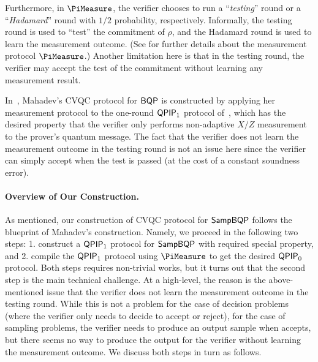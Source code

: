 Furthermore, in $\PiMeasure$, the verifier chooses to run a ``\emph{testing}'' round or a ``\emph{Hadamard}'' round with $1/2$ probability, respectively. Informally, the testing round is used to ``test'' the commitment of $\rho$, and the Hadamard round is used to learn the measurement outcome. (See  for further details about the measurement protocol $\PiMeasure$.) Another limitation here is that in the testing round, the verifier may accept the test of the commitment without learning any measurement result. 

In~\cite{FOCS:Mahadev18a}, Mahadev's CVQC protocol for $\operatorname{\mathsf{BQP}}$ is constructed by applying her measurement protocol to the one-round $\operatorname{\mathsf{QPIP}}_1$ protocol of~\cite{PhysRevA.93.022326, mf16}, which has the desired property that the verifier only performs non-adaptive $X/Z$ measurement to the prover's quantum message. The fact that the verifier does not learn the measurement outcome in the testing round is not an issue here since the verifier can simply accept when the test is passed (at the cost of a constant soundness error).

\paragraph{Overview of Our Construction.}
As mentioned, our construction of CVQC protocol for $\operatorname{\mathsf{SampBQP}}$ follows the blueprint of Mahadev's construction. Namely, we proceed in the following two steps: 1. construct a $\operatorname{\mathsf{QPIP}}_1$ protocol for $\operatorname{\mathsf{SampBQP}}$ with required special property, and 2. compile the $\operatorname{\mathsf{QPIP}}_1$ protocol using $\PiMeasure$ to get the desired $\operatorname{\mathsf{QPIP}}_0$ protocol. Both steps requires non-trivial works, but it turns out that the second step is the main technical challenge. At a high-level, the reason is the above-mentioned issue that the verifier does not learn the measurement outcome in the testing round. While this is not a problem for the case of decision problems (where the verifier only needs to decide to accept or reject), for the case of sampling problems, the verifier needs to produce an output sample when accepts, but there seems no way to produce the output for the verifier without learning the measurement outcome.   
%
We discuss both steps in turn as follows.


